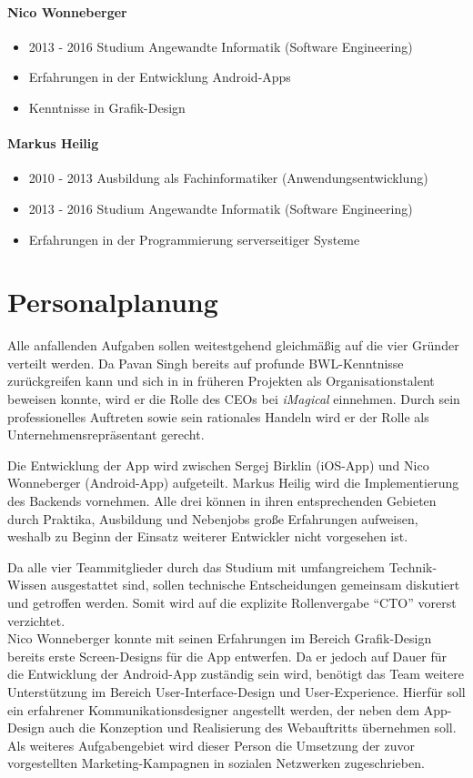 \paragraph{Nico Wonneberger}
\begin{itemize}
\item 2013 - 2016 Studium Angewandte Informatik (Software Engineering)
\item Erfahrungen in der Entwicklung Android-Apps
\item Kenntnisse in Grafik-Design
\end{itemize}

\paragraph{Markus Heilig}
\begin{itemize}
\item 2010 - 2013 Ausbildung als Fachinformatiker (Anwendungsentwicklung)
\item 2013 - 2016 Studium Angewandte Informatik (Software Engineering)
\item Erfahrungen in der Programmierung serverseitiger Systeme
\end{itemize}


\section{Personalplanung}

Alle anfallenden Aufgaben sollen weitestgehend gleichmäßig auf die vier Gründer verteilt werden.
Da Pavan Singh bereits auf profunde BWL-Kenntnisse zurückgreifen kann und sich in in früheren Projekten als Organisationstalent beweisen konnte, wird er die Rolle des CEOs bei \textit{iMagical} einnehmen. Durch sein professionelles Auftreten sowie sein rationales Handeln wird er der Rolle als Unternehmensrepräsentant gerecht.

Die Entwicklung der App wird zwischen Sergej Birklin (iOS-App) und Nico Wonneberger (Android-App) aufgeteilt. Markus Heilig wird die Implementierung des Backends vornehmen. Alle drei können in ihren entsprechenden Gebieten durch Praktika, Ausbildung und Nebenjobs große Erfahrungen aufweisen, weshalb zu Beginn der Einsatz weiterer Entwickler nicht vorgesehen ist.

Da alle vier Teammitglieder durch das Studium mit umfangreichem Technik-Wissen ausgestattet sind, sollen technische Entscheidungen gemeinsam diskutiert und getroffen werden. Somit wird auf die explizite Rollenvergabe ``CTO'' vorerst verzichtet. \\

Nico Wonneberger konnte mit seinen Erfahrungen im Bereich Grafik-Design bereits erste Screen-Designs für die App entwerfen.
Da er jedoch auf Dauer für die Entwicklung der Android-App zuständig sein wird, benötigt das Team weitere Unterstützung im Bereich User-Interface-Design und User-Experience. Hierfür soll ein erfahrener Kommunikationsdesigner angestellt werden, der neben dem App-Design auch die Konzeption und Realisierung des Webauftritts übernehmen soll. Als weiteres Aufgabengebiet wird dieser Person die Umsetzung der zuvor vorgestellten Marketing-Kampagnen in sozialen Netzwerken zugeschrieben.

